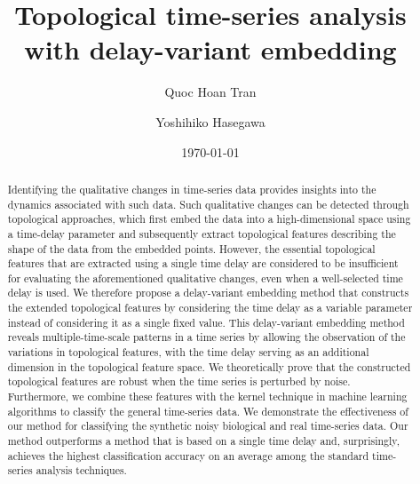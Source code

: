 \documentclass[twocolumn,pre,amsmath,amssymb]{revtex4-1}
\begin{document}
\title{Topological time-series analysis with delay-variant embedding}
\author{Quoc Hoan Tran}

\author{Yoshihiko Hasegawa}



\date{\today}

\begin{abstract}
Identifying the qualitative changes in time-series data provides insights into the dynamics associated with such data. 
Such qualitative changes can be detected through topological approaches, which first embed the data into a high-dimensional space using a time-delay parameter and subsequently extract topological features describing the shape of the data from the embedded points.
However, the essential topological features that are extracted using a single time delay  
are considered to be insufficient for evaluating the aforementioned qualitative changes,
even when a well-selected time delay is used.
We therefore propose a delay-variant embedding method that constructs the extended topological features by considering the time delay as a variable parameter
instead of considering it as a single fixed value.
This delay-variant embedding method reveals multiple-time-scale patterns in a time series by allowing the observation of the variations in topological features, with the time delay serving as an additional dimension in the topological feature space.
We theoretically prove that the constructed topological features are robust
when the time series is perturbed by noise. 
Furthermore, we combine these features with the kernel technique in machine learning algorithms to classify the general time-series data. 
We demonstrate the effectiveness of our method for classifying the synthetic noisy biological and real time-series data. Our method outperforms a method
that is based on a single time delay and, surprisingly, achieves the highest classification accuracy on an average among the standard time-series analysis techniques.
\end{abstract}
\end{document}

